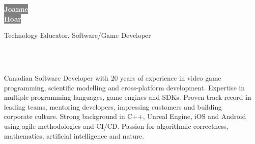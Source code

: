 \documentclass[9pt]{developercv}
\begin{document}
\raggedbottom


\begin{minipage}[t]{0.70\textwidth}
\colorbox{gray}{\HUGE\textcolor{white}{\textbf{Joanne}}} \\
\colorbox{gray}{\HUGE\textcolor{white}{\textbf{Hoar}}}

{\huge Technology Educator, Software/Game Developer}
\end{minipage}
\begin{minipage}[t]{0.05\textwidth}
\end{minipage}
\begin{minipage}[t]{0.25\textwidth}
\\
\\
\end{minipage}

\vspace{0.5cm}


Canadian Software Developer with 20 years of experience in video game programming, scientific modelling and cross-platform development. Expertise in multiple programming languages, game engines and SDKs. Proven track record in leading teams, mentoring developers, impressing customers and building corporate culture. Strong background in C++, Unreal Engine, iOS and Android using agile methodologies and CI/CD. Passion for algorithmic correctness, mathematics, artificial intelligence and nature.

\end{document}
